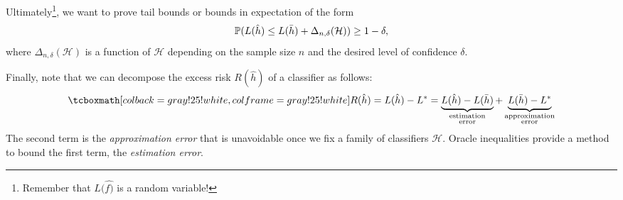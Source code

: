 Ultimately\footnote{Remember that $L(\hat{f)}$ is a random variable!}, we want to prove tail bounds or bounds in expectation of the form
\[
    \P(L(\hat{h}) \leq L(\bar{h}) + \Delta_{n, \delta}(\mathcal{H})) \geq 1 - \delta,
\]
where $\Delta_{n, \delta}(\mathcal{H})$ is a function of $\mathcal{H}$ depending on the sample size $n$ and the desired level of confidence $\delta$.

Finally, note that we can decompose the excess risk $R(\hat{h})$ of a classifier as follows:
\[
    \highlightMath{
        R(\hat{h}) = L(\hat{h}) - L^* = \underbrace{L(\hat{h}) - L(\bar{h})}_{\substack{\text{estimation} \\ \text{error}}} + \underbrace{L(\bar{h}) - L^*}_{\substack{\text{approximation} \\ \text{error}}}
    }
\]
The second term is the \emph{approximation error} that is unavoidable once we fix a family of classifiers $\mathcal{H}$. Oracle inequalities provide a method to bound the first term, the \emph{estimation error}.
